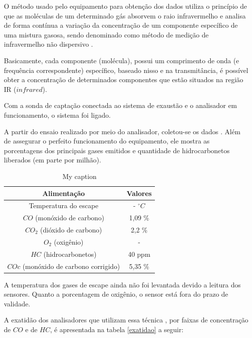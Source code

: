 O método usado pelo equipamento para obtenção dos dados utiliza o princípio de que as moléculas de um determinado gás absorvem o raio infravermelho e analisa de forma contínua a variação da concentração de um componente específico de uma mistura gasosa, sendo denominado como método de medição de infravermelho não dispersivo \cite{nereu}.

Basicamente, cada componente (molécula), possui um comprimento de onda (e frequência correspondente) específico, baseado nisso e na transmitância, é possível obter a concentração de determinados componentes que estão situados na região IR ($infrared$).

Com a sonda de captação conectada ao sistema de exaustão e o analisador em funcionamento, o sistema foi ligado.



A partir do ensaio realizado por meio do analisador, coletou-se os dados . Além de assegurar o perfeito funcionamento do equipamento, ele mostra as porcentagens dos principais gases emitidos e quantidade de hidrocarbonetos liberados (em parte por milhão).

\begin{table}[]
	\centering
	\caption{My caption}
	\label{my-label}
	\begin{tabular}{|c|c|}
		\hline
		\textbf{Alimentação}                  & \textbf{Valores} \\ \hline
		Temperatura do escape                 & - $^{\circ}C$    \\ \hline
		$CO$ (monóxido de carbono)            & 1,09 \%          \\ \hline
		$CO_{2}$ (dióxido de carbono)         & 2,2 \%           \\ \hline
		$O_{2}$ (oxigênio)                    & -                \\ \hline
		$HC$ (hidrocarbonetos)                & 40 ppm           \\ \hline
		$COc$ (monóxido de carbono corrigido) & 5,35 \%          \\ \hline
	\end{tabular}
\end{table}

A temperatura dos gases de escape ainda não foi levantada devido a leitura dos sensores. Quanto a porcentagem de oxigênio, o sensor está fora do prazo de validade.

A exatidão dos analisadores que utilizam essa técnica , por faixas de concentração de $CO$ e de $HC$, é apresentada na tabela \ref{exatidao} a seguir:

